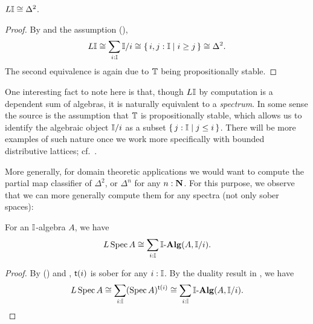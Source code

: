 \begin{corollary}[\AxiomSQCI]
  $L \mathbb{I} \cong \Delta^2$.
\end{corollary}
\begin{proof}
  By  and the assumption (\AxiomSQCI),
  \[ L\I \cong \sum_{i:\I}\I/i \cong \scomp{i,j : \I}{i \ge j} \cong \Delta^2\text{.} \]
  The second equivalence is again due to $\mathbb{T}$ being propositionally stable.
\end{proof}

\begin{remark}\label{rem:alggeoI}
  One interesting fact to note here is that, though $L\mathbb{I}$ by computation is a dependent sum of algebras, it is naturally equivalent to a \emph{spectrum}. In some sense the source is the assumption that $\mathbb{T}$ is propositionally stable, which allows us to identify the algebraic object $\mathbb{I}/i$ as a subset $\{\,j : \mathbb{I}\mid j \le i\,\}$. There will be more examples of such nature once we work more specifically with bounded distributive lattices; cf.\ .
\end{remark}

More generally, for domain theoretic applications we would want to compute the partial map classifier of $\Delta^2$, or $\Delta^n$ for any $n:\mathbf{N}$. For this purpose, we observe that we can more generally compute them for any spectra (not only sober spaces):

\begin{proposition}[\AxiomSQCI]\label{prop:liftofsober}
  For an $\mathbb{I}$-algebra $A$, we have
  \[ L\spec A \cong \sum_{i:\I}\I\alg(A,\I/i)\text{.} \]
\end{proposition}
\begin{proof}
  By (\AxiomSQCI) and , $\mathsf{t}(i)$ is sober for any $i:\mathbb{I}$. By the duality result in , we have
  \[ L\spec A \cong \sum_{i:\I}(\spec A)^{\ist{i}}\cong \sum_{i:\I}\I\alg(A,\I/i). \qedhere \]
\end{proof}




